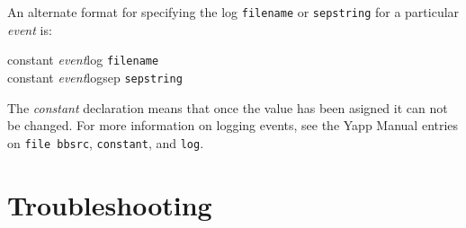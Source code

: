 \documentclass[twoside]{report}
\begin{document}
     
   
         An alternate format for specifying the log {\tt filename} or 
         {\tt sepstring} for a particular {\em event} is:
   
         {\centering constant {\em event}log    {\tt filename}}\\
         {\centering constant {\em event}logsep {\tt sepstring}}
   
         The {\em constant} declaration means that once the value has
         been asigned it can not be changed.  For more information on 
         logging events, see the Yapp Manual entries  on 
         {\tt file bbsrc}, {\tt constant}, 
         and {\tt log}.
   
\chapter{Troubleshooting} \label {c:trouble}
\end{document}
